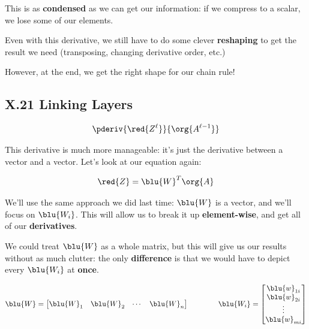         This is as \textbf{condensed} as we can get our information: if we compress to a scalar, we lose some of our elements.
        
        Even with this derivative, we still have to do some clever \textbf{reshaping} to get the result we need (transposing, changing derivative order, etc.)
        
        However, at the end, we get the right shape for our chain rule!
        
    \secdiv
            
    \subsection*{X.21 \quad Linking Layers}
                
        \begin{equation}
            \pderiv{\red{Z^\ell}} {\org{A^{\ell-1}}}
        \end{equation}
        
        This derivative is much more manageable: it's just the derivative between a vector and a vector. Let's look at our equation again:
        
        \begin{equation}
            \red{Z} = \blu{W}^T\org{A}
        \end{equation}
        
        We'll use the same approach we did last time: $\blu{W}$ is a vector, and we'll focus on $\blu{W_i}$. This will allow us to break it up \textbf{element-wise}, and get all of our \textbf{derivatives}.
        
        We could treat $\blu{W}$ as a whole matrix, but this will give us our results without as much clutter: the only \textbf{difference} is that we would have to depict every $\blu{W_i}$ at \textbf{once}.
        
        \begin{equation}
            \blu{W}
            =
            \begin{bmatrix}
                \blu{W}_1 & \blu{W}_2 & \cdots & \blu{W}_n
            \end{bmatrix}
            \qquad\qquad
            \blu{W_i} = 
            \begin{bmatrix}
                \blu{w}_{1i} \\ \blu{w}_{2i} \\ \vdots \\ \blu{w}_{mi}
            \end{bmatrix}
        \end{equation}
        
